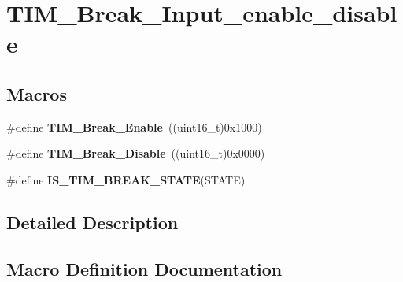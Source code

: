 \hypertarget{group___t_i_m___break___input__enable__disable}{}\section{T\+I\+M\+\_\+\+Break\+\_\+\+Input\+\_\+enable\+\_\+disable}
\label{group___t_i_m___break___input__enable__disable}
\subsection*{Macros}
\begin{DoxyCompactItemize}
\item 
\hypertarget{group___t_i_m___break___input__enable__disable_gae7fbc11ac043454b2a880bffe98fdb8c}{}\#define {\bfseries T\+I\+M\+\_\+\+Break\+\_\+\+Enable}~((uint16\+\_\+t)0x1000)\label{group___t_i_m___break___input__enable__disable_gae7fbc11ac043454b2a880bffe98fdb8c}

\item 
\hypertarget{group___t_i_m___break___input__enable__disable_ga31ba16dd70ad4d99adc911f7bf6662e5}{}\#define {\bfseries T\+I\+M\+\_\+\+Break\+\_\+\+Disable}~((uint16\+\_\+t)0x0000)\label{group___t_i_m___break___input__enable__disable_ga31ba16dd70ad4d99adc911f7bf6662e5}

\item 
\#define {\bfseries I\+S\+\_\+\+T\+I\+M\+\_\+\+B\+R\+E\+A\+K\+\_\+\+S\+T\+A\+T\+E}(S\+T\+A\+T\+E)
\end{DoxyCompactItemize}


\subsection{Detailed Description}


\subsection{Macro Definition Documentation}
\hypertarget{group___t_i_m___break___input__enable__disable_ga29dd5484bdc69a467387bd8059b69f0e}{}
